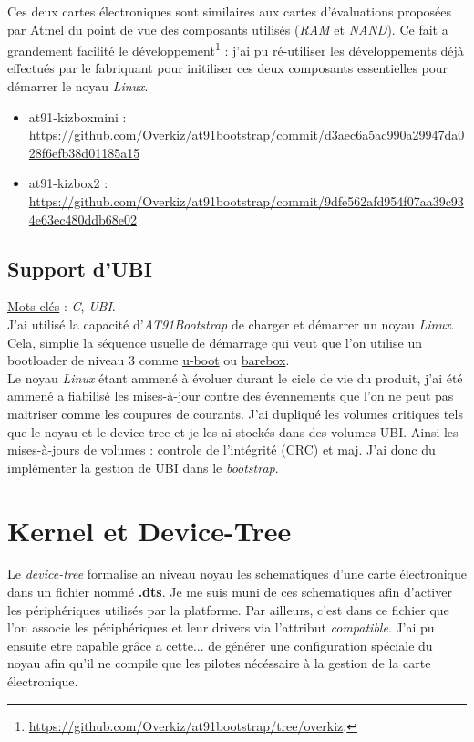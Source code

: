 \documentclass[a4paper]{article}
\begin{document}
Ces deux cartes électroniques sont similaires aux cartes d'évaluations proposées par Atmel du point de vue des composants utilisés (\textit{RAM} et \textit{NAND}). Ce fait a grandement facilité le développement\footnote{\url{https://github.com/Overkiz/at91bootstrap/tree/overkiz}.} : j'ai pu ré-utiliser les développements déjà effectués par le fabriquant pour initiliser ces deux composants essentielles pour démarrer le noyau \textit{Linux}.
\begin{itemize}
\item at91-kizboxmini : \url{https://github.com/Overkiz/at91bootstrap/commit/d3aec6a5ac990a29947da028f6efb38d01185a15}
\item at91-kizbox2 : \url{https://github.com/Overkiz/at91bootstrap/commit/9dfe562afd954f07aa39c934e63ec480ddb68e02}
\end{itemize}

\subsection{Support d'UBI}

\underline{Mots clés} : \textit{C}, \textit{UBI}.\\

J'ai utilisé la capacité d'\textit{AT91Bootstrap} de charger et démarrer un noyau \textit{Linux}. Cela, simplie la séquence usuelle de démarrage qui veut que l'on utilise un bootloader de niveau 3 comme \href{http://www.denx.de/wiki/U-Boot}{u-boot} ou \href{http://www.barebox.org/}{barebox}.\\

Le noyau \textit{Linux} étant ammené à évoluer durant le cicle de vie du produit, j'ai été ammené a fiabilisé les mises-à-jour contre des évennements que l'on ne peut pas maitriser comme les coupures de courants. J'ai dupliqué les volumes critiques tels que le noyau et le device-tree et je les ai stockés dans des volumes UBI. Ainsi les mises-à-jours de volumes : controle de l'intégrité (CRC) et maj. J'ai donc du implémenter la gestion de UBI dans le \textit{bootstrap}.

\section{Kernel et Device-Tree}

Le \textit{device-tree} formalise an niveau noyau les schematiques d'une carte électronique dans un fichier nommé \textbf{.dts}. Je me suis muni de ces schematiques afin d'activer les périphériques utilisés par la platforme. Par ailleurs, c'est dans ce fichier que l'on associe les périphériques et leur drivers via l'attribut \textit{compatible}. J'ai pu ensuite etre capable grâce a cette... de générer une configuration spéciale du noyau afin qu'il ne compile que les pilotes nécéssaire à la gestion de la carte électronique.
\end{document}
